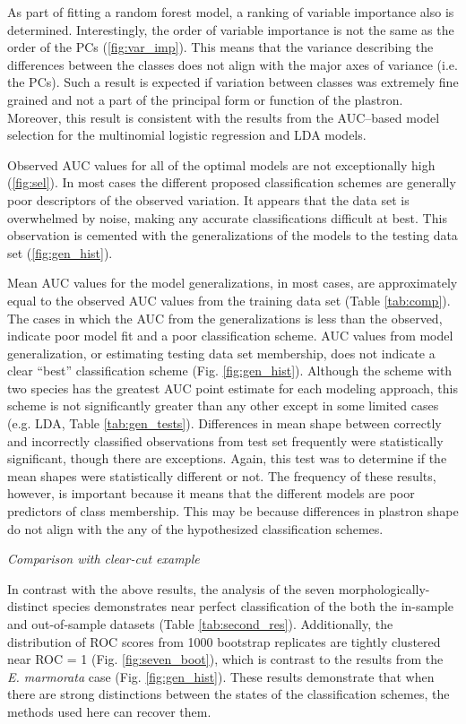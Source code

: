 \documentclass[12pt,letterpaper]{article}
\renewcommand{\subsection}[1]{%
\bigskip
\begin{center}
\begin{large}
\normalfont\itshape #1
\end{large}
\end{center}}
\begin{document}
As part of fitting a random forest model, a ranking of variable importance also is determined. Interestingly, the order of variable importance is not the same as the order of the PCs (\ref{fig:var_imp}). This means that the variance describing the differences between the classes does not align with the major axes of variance (i.e. the PCs). Such a result is expected if variation between classes was extremely fine grained and not a part of the principal form or function of the plastron. Moreover, this result is consistent with the results from the AUC--based model selection for the multinomial logistic regression and LDA models.

Observed AUC values for all of the optimal models are not exceptionally high (\ref{fig:sel}). In most cases the different proposed classification schemes are generally poor descriptors of the observed variation. It appears that the data set is overwhelmed by noise, making any accurate classifications difficult at best. This observation is cemented with the generalizations of the models to the testing data set (\ref{fig:gen_hist}).

Mean AUC values for the model generalizations, in most cases, are approximately equal to the observed AUC values from the training data set (Table \ref{tab:comp}). The  cases in which the AUC from the  generalizations is less than the observed, indicate poor model fit and a poor classification scheme. AUC values from model generalization, or estimating testing data set membership, does not indicate a clear ``best'' classification scheme (Fig. \ref{fig:gen_hist}). Although the scheme with two species has the greatest AUC point estimate for each modeling approach, this scheme is not significantly greater than any other except in some limited cases (e.g. LDA, Table \ref{tab:gen_tests}). 
Differences in mean shape between correctly and incorrectly classified observations from test set frequently were statistically significant, though there are exceptions. Again, this test was to determine if the mean shapes were statistically different or not. The frequency of these results, however, is important because it means that the different models are poor predictors of class membership. This may be because differences in plastron shape do not align with the any of the hypothesized classification schemes.

\subsection{Comparison with clear-cut example}
In contrast with the above results, the analysis of the seven morphologically-distinct species demonstrates near perfect classification of the both the in-sample and out-of-sample datasets (Table \ref{tab:second_res}). Additionally, the distribution of ROC scores from 1000 bootstrap replicates are tightly clustered near ROC = 1 (Fig. \ref{fig:seven_boot}), which is contrast to the results from the \textit{E. marmorata} case (Fig. \ref{fig:gen_hist}). These results demonstrate that when there are strong distinctions between the states of the classification schemes, the methods used here can recover them.
\end{document}
